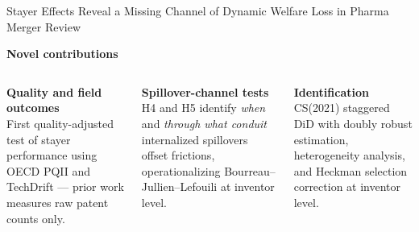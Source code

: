 \documentclass[10pt,aspectratio=169]{beamer}
\begin{document}
\begin{frame}{Stayer Effects Reveal a Missing Channel of Dynamic Welfare Loss in Pharma Merger Review}

\vspace{0.3em}
\textbf{Novel contributions}

\vspace{0.3em}
\begin{columns}[T]
  {\small\color{accentred}\textbf{Quality and field outcomes}}\\[0.3em]
  {\footnotesize First quality-adjusted test of stayer performance using OECD PQII and TechDrift --- prior work measures raw patent counts only.}

  {\small\color{accentgreen}\textbf{Spillover-channel tests}}\\[0.3em]
  {\footnotesize H4 and H5 identify \textit{when} and \textit{through what conduit} internalized spillovers offset frictions, operationalizing Bourreau--Jullien--Lefouili at inventor level.}

  {\small\color{darkblue}\textbf{Identification}}\\[0.3em]
  {\footnotesize CS(2021) staggered DiD with doubly robust estimation, heterogeneity analysis, and Heckman selection correction at inventor level.}
\end{columns}

\vspace{0.6em}
\begin{center}
\end{center}

\end{frame}
\end{document}
